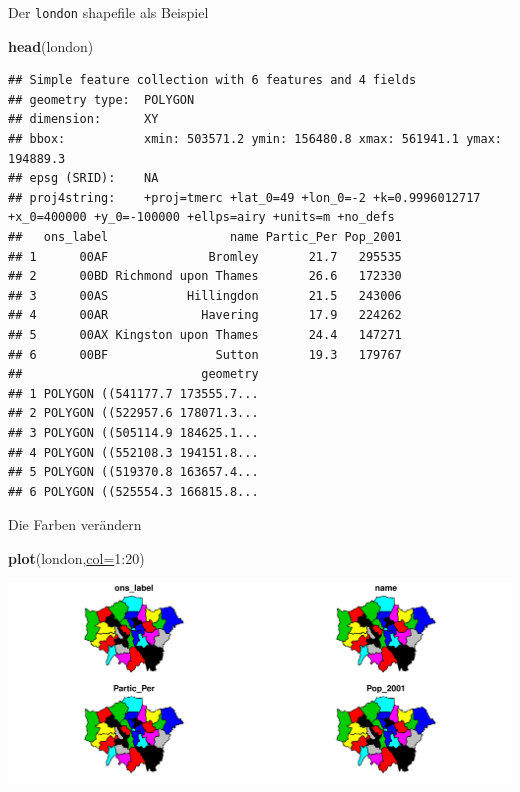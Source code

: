 \documentclass[ignorenonframetext,]{beamer}
\newenvironment{Shaded}{\begin{snugshade}}{\end{snugshade}}
\newcommand{\DataTypeTok}[1]{\textcolor[rgb]{0.74,0.68,0.62}{\underline{#1}}}
\newcommand{\DecValTok}[1]{\textcolor[rgb]{0.27,0.67,0.26}{#1}}
\newcommand{\KeywordTok}[1]{\textcolor[rgb]{0.26,0.66,0.93}{\textbf{#1}}}
\newcommand{\NormalTok}[1]{\textcolor[rgb]{0.74,0.68,0.62}{#1}}
\newcommand{\OperatorTok}[1]{\textcolor[rgb]{0.74,0.68,0.62}{#1}}
\begin{document}
\begin{frame}[fragile]{Der \texttt{london} shapefile als Beispiel}
\protect\hypertarget{der-london-shapefile-als-beispiel}{}

\begin{Shaded}
\begin{Highlighting}[]
\KeywordTok{head}\NormalTok{(london)}
\end{Highlighting}
\end{Shaded}

\begin{verbatim}
## Simple feature collection with 6 features and 4 fields
## geometry type:  POLYGON
## dimension:      XY
## bbox:           xmin: 503571.2 ymin: 156480.8 xmax: 561941.1 ymax: 194889.3
## epsg (SRID):    NA
## proj4string:    +proj=tmerc +lat_0=49 +lon_0=-2 +k=0.9996012717 +x_0=400000 +y_0=-100000 +ellps=airy +units=m +no_defs
##   ons_label                 name Partic_Per Pop_2001
## 1      00AF              Bromley       21.7   295535
## 2      00BD Richmond upon Thames       26.6   172330
## 3      00AS           Hillingdon       21.5   243006
## 4      00AR             Havering       17.9   224262
## 5      00AX Kingston upon Thames       24.4   147271
## 6      00BF               Sutton       19.3   179767
##                         geometry
## 1 POLYGON ((541177.7 173555.7...
## 2 POLYGON ((522957.6 178071.3...
## 3 POLYGON ((505114.9 184625.1...
## 4 POLYGON ((552108.3 194151.8...
## 5 POLYGON ((519370.8 163657.4...
## 6 POLYGON ((525554.3 166815.8...
\end{verbatim}

\end{frame}

\begin{frame}[fragile]{Die Farben verändern}
\protect\hypertarget{die-farben-verandern}{}

\begin{Shaded}
\begin{Highlighting}[]
\KeywordTok{plot}\NormalTok{(london,}\DataTypeTok{col=}\DecValTok{1}\OperatorTok{:}\DecValTok{20}\NormalTok{)}
\end{Highlighting}
\end{Shaded}

\includegraphics{B7_simplefeatures_files/figure-beamer/unnamed-chunk-10-1.pdf}

\end{frame}
\end{document}
